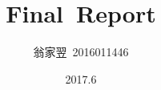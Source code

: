 \documentclass[a4paper]{article}
\title{\bf Final~Report}
\date{2017.6}
\author{翁家翌~2016011446}
\begin{document}
\kaishu
\ttfamily
\maketitle
\tableofcontents
\end{document}
